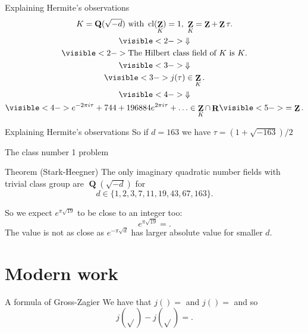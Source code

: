 \documentclass{beamer}
\DeclareMathOperator{\cl}{cl}
\DeclareMathOperator{\ZZ}{\mathbf{Z}}
\DeclareMathOperator{\QQ}{\mathbf{Q}}
\DeclareMathOperator{\RR}{\mathbf{R}}
\begin{document}
\begin{frame}{Explaining Hermite's observations}
\begin{gather*}
K = \QQ(\sqrt{-d}) \text{ with } \cl(\ZZ_K) = 1,\ \ZZ_K = \ZZ+\ZZ\tau.\\
\visible<2->{\Downarrow}\\
\visible<2->{\text{The Hilbert class field of $K$ is $K$}.}\\
\visible<3->{\Downarrow}\\
\visible<3->{j(\tau)\in \ZZ_K.}\\
\visible<4->{\Downarrow}\\
\visible<4->{e^{-2\pi i \tau} + 744 + 196884 e^{2\pi i \tau} + \ldots\in \ZZ_K\cap \RR}\visible<5->{ = \ZZ.}
\end{gather*}
\end{frame}

\begin{frame}{Explaining Hermite's observations}
So if $d= 163$ we have $\tau = (1 + \sqrt{-163})/2$

\end{frame}

\begin{frame}{The class number 1 problem}
\begin{block}{Theorem (Stark-Heegner)}
The only imaginary quadratic number fields with trivial class group are $\QQ(\sqrt{-d})$ for
\[d\in\{1,2,3,7,11,19,43,67,163\}.\]
\end{block}
\pause
So we expect $e^{\pi\sqrt{19}}$ to be close to an integer too:
\[
e^{\pi\sqrt{19}} = .
\]
\pause The value is not as close as $e^{-\pi\sqrt{d}}$ has larger absolute value for smaller $d$.
\end{frame}

\section{Modern work}
\begin{frame}{A formula of Gross-Zagier}
We have that $j() = $ and $j() = $ and so
\[
j(\sqrt{}) - j(\sqrt{}) = .
\]


\end{frame}
\end{document}
